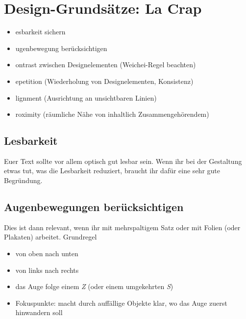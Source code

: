 \section{Design-Grundsätze: La Crap}
\label{lacrap}

\begin{itemize}
    \item {}esbarkeit sichern
    \item {}ugenbewegung berücksichtigen

    \smallskip
    \item {}ontrast zwischen Designelementen (Weichei-Regel beachten)
    \item {}epetition (Wiederholung von Designelementen, Konsistenz)
    \item {}lignment (Ausrichtung an unsichtbaren Linien)
    \item {}roximity (räumliche Nähe von inhaltlich Zusammengehörendem)
\end{itemize}

\subsection{Lesbarkeit}
Euer Text sollte vor allem optisch gut lesbar sein. Wenn ihr bei der Gestaltung etwas tut, was die Lesbarkeit reduziert, braucht ihr dafür eine sehr gute Begründung.

\subsection{Augenbewegungen berücksichtigen}
Dies ist dann relevant, wenn ihr mit mehrspaltigem Satz oder mit Folien (oder Plakaten) arbeitet. Grundregel
\begin{itemize}
    \item von oben nach unten
    \item von links nach rechts
    \item das Auge folge einem \emph{Z} (oder einem umgekehrten \emph{S})
    \item Fokuspunkte: macht durch auffällige Objekte klar, wo das Auge zuerst hinwandern soll
\end{itemize}

